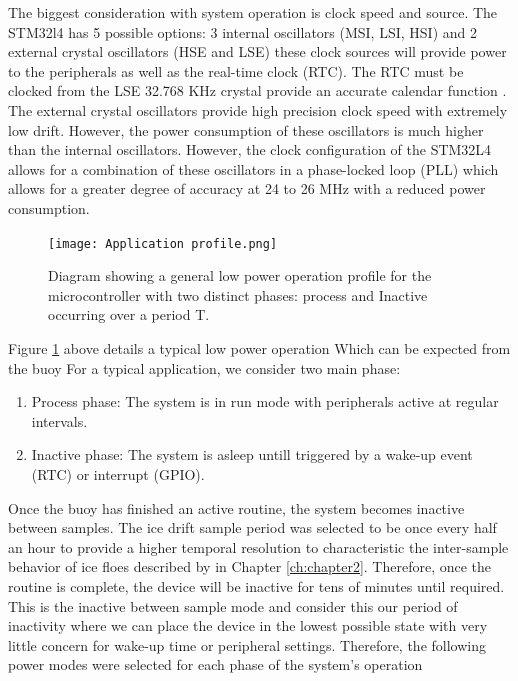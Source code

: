 The biggest consideration with system operation is clock speed and source. The STM32l4 has 5 possible options: 3 internal oscillators (MSI, LSI, HSI) and 2 external crystal oscillators (HSE and LSE) these clock sources will provide power to the peripherals as well as the real-time clock (RTC). The RTC must be clocked from the LSE 32.768 KHz crystal provide an accurate calendar function \cite{stm32l4}. The external crystal oscillators provide high precision clock speed with extremely low drift. However, the power consumption of these oscillators is much higher than the internal oscillators. However, the clock configuration of the STM32L4 allows for a combination of these oscillators in a phase-locked loop (PLL) which allows for a greater degree of accuracy at 24 to 26 MHz with a reduced power consumption. 

\begin{figure}[H]
	\centering
	\texttt{[image: Application profile.png]}
	\caption{Diagram showing a general low power operation profile  for the microcontroller with two distinct phases: process and Inactive occurring over a period T.}
	\label{fig:appr}
\end{figure}

Figure \ref{fig:appr} above details a typical low power operation Which can be expected from the buoy For a typical application, we consider two main phase:

\begin{enumerate}
	\item Process phase: The system is in run mode with peripherals active at regular intervals.
	\item Inactive phase: The system is asleep untill triggered by a wake-up event (RTC) or interrupt (GPIO).
\end{enumerate}

Once the buoy has finished an active routine, the system becomes inactive between samples. The ice drift sample period was selected to be once every half an hour to provide a higher temporal resolution to characteristic the inter-sample behavior of ice floes described by \textcite{vichi2019effects} in Chapter \ref{ch:chapter2}. Therefore, once the routine is complete, the device will be inactive for tens of minutes until required. This is the inactive between sample mode and consider this our period of inactivity where we can place the device in the lowest possible state with very little concern for wake-up time or peripheral settings. Therefore, the following power modes were selected for each phase of the system's operation

